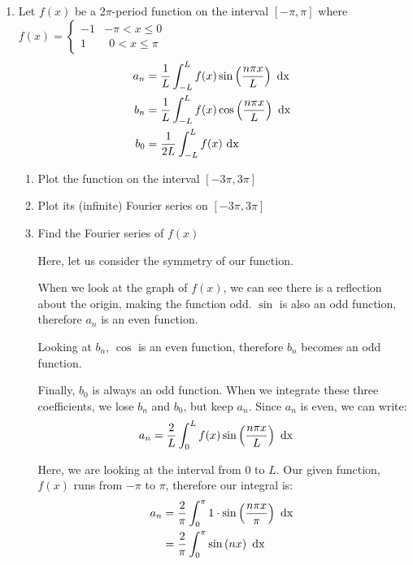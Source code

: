 \documentclass{article}
\begin{document}
\begin{enumerate}
  \item Let $f(x)$ be a $2 \pi$-period function on the interval $[-\pi, \pi]$ where
  $\displaystyle
  f(x) =
  \begin{cases}
    -1 & - \pi < x \leq 0\\
    1 &\ \ 0 < x \leq \pi
  \end{cases}
  $
  \begin{align}
    a_n & = \frac{1}{L}  \int^L_{-L} f(x) \sin\left( \frac{n \pi x}{L} \right) \text{ dx }\\
    b_n & = \frac{1}{L}  \int^L_{-L} f(x) \cos\left( \frac{n \pi x}{L} \right) \text{ dx }\\
    b_0 & = \frac{1}{2L} \int^L_{-L} f(x) \text{ dx }
  \end{align}
  \begin{enumerate}
%
    \item Plot the function on the interval $[-3\pi, 3\pi]$

    \item Plot its (infinite) Fourier series on $[-3 \pi, 3 \pi]$

    \item Find the Fourier series of $f(x)$

    Here, let us consider the symmetry of our function.

    When we look at the graph of $f(x)$, we can see there is a reflection about the origin, making the function odd. $\sin$ is also an odd function, therefore $a_n$ is an even function.

    Looking at $b_n$, $\cos$ is an even function, therefore $b_n$ becomes an odd function.

    Finally, $b_0$ is always an odd function. When we integrate these three coefficients, we lose $b_n$ and $b_0$, but keep $a_n$. Since $a_n$ is even, we can write:
%
    \begin{align}
      a_n & = \frac{2}{L} \int^L_0 f(x) \sin\left( \frac{n \pi x}{L} \right) \text{ dx }
    \end{align}

    Here, we are looking at the interval from $0$ to $L$. Our given function, $f(x)$ runs from $-\pi$ to $\pi$, therefore our integral is:
%
    \begin{align}
      a_n & = \frac{2}{\pi} \int^\pi_0 1 \cdot \sin\left( \frac{n \pi x}{\pi} \right) \text{ dx }\\
      & = \frac{2}{\pi} \int^\pi_0 \sin\left( n x \right) \text{ dx }
    \end{align}


\end{enumerate}
\end{enumerate}
\end{document}
